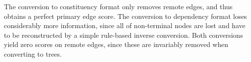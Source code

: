 \documentclass[11pt]{article}
\begin{document}


The conversion to constituency format only removes remote edges,
and thus obtains a perfect primary edge score.
The conversion to dependency format loses considerably more information, since
all of non-terminal nodes are lost and have to be reconstructed by a
simple rule-based inverse conversion. Both conversions yield zero scores on remote edges,
since these are invariably removed when converting to trees.
\end{document}
